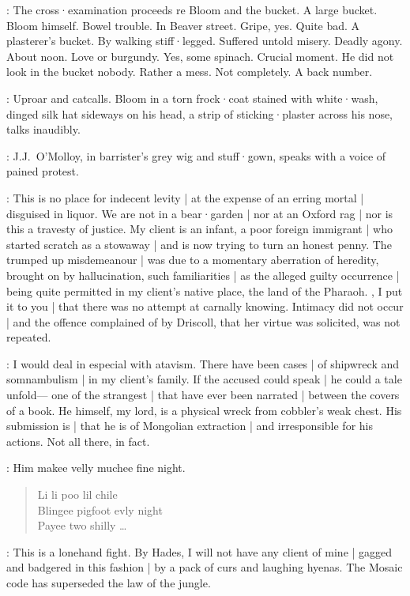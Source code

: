 :
The cross·examination proceeds re Bloom and the bucket.
A large bucket.
Bloom himself.
Bowel trouble.
In Beaver street.
Gripe,
yes.
Quite bad.
A plasterer's bucket.
By walking stiff·legged.
Suffered untold misery.
Deadly agony.
About noon.
Love or burgundy.
Yes,
some spinach.
Crucial moment.
He did not look in the bucket nobody.
Rather a mess.
Not completely.
A 
back number.

:
Uproar and catcalls.
Bloom in a torn frock·coat stained with white·wash,
dinged silk hat sideways on his head,
a strip of sticking·plaster across his nose,
talks inaudibly.

:
J.J.~O'Molloy,
in barrister's grey wig and stuff·gown,
speaks with a voice of pained protest.

\JJOM:
This is no place for indecent levity |
at the expense of an erring mortal |
disguised in liquor.
We are not in a bear·garden |
nor at an Oxford rag |
nor is this a travesty of justice.
My client is an infant,
a poor foreign immigrant |
who started scratch as a stowaway |
and is now trying to turn an honest penny.
The trumped up misdemeanour |
was due to a momentary aberration of heredity,
brought on by hallucination,
such familiarities |
as the alleged guilty occurrence |
being quite permitted in my client's native place,
the land of the Pharaoh.
,
I put it to you |
that there was no attempt at carnally knowing.
Intimacy did not occur |
and the offence complained of by Driscoll,
that her virtue was solicited,
was not repeated.

\begin{omitted}
\JJOM:
I would deal in especial with atavism.
There have been cases |
of shipwreck and somnambulism |
in my client's family.
If the accused could speak |
he could a tale unfold---%
one of the strangest |
that have ever been narrated |
between the covers of a book.
He himself,
my lord,
is a physical wreck from cobbler's weak chest.
His submission is |
that he is of Mongolian extraction |
and irresponsible for his actions.
Not all there,
in fact.

\Bloom:
Him makee velly muchee fine night.
\begin{verse}
    Li li poo lil chile\\
    Blingee pigfoot evly night\\
    Payee two shilly \ldots
\end{verse}


\JJOM:
This is a lonehand fight.
By Hades,
I will not have any client of mine |
gagged and badgered in this fashion |
by a pack of curs and laughing hyenas.
The Mosaic code has superseded the law of the jungle.
\end{omitted}

